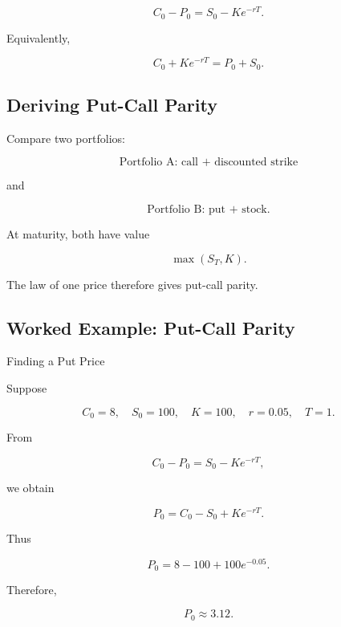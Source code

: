 \[
\boxed{
C_0-P_0
=
S_0-Ke^{-rT}.
}
\]

Equivalently,

\[
\boxed{
C_0+Ke^{-rT}
=
P_0+S_0.
}
\]

\subsection{Deriving Put-Call Parity}
\label{subsec:deriving-put-call-parity}

Compare two portfolios:

\[
\boxed{
\text{Portfolio A: call + discounted strike}
}
\]

and

\[
\boxed{
\text{Portfolio B: put + stock}.
}
\]

At maturity, both have value

\[
\boxed{
\max(S_T,K).
}
\]

The law of one price therefore gives put-call parity.

\subsection{Worked Example: Put-Call Parity}
\label{subsec:worked-put-call-parity}

\begin{workedexamplebox}{Finding a Put Price}

Suppose

\[
C_0=8,
\quad
S_0=100,
\quad
K=100,
\quad
r=0.05,
\quad
T=1.
\]

From

\[
C_0-P_0
=
S_0-Ke^{-rT},
\]

we obtain

\[
P_0
=
C_0-S_0+Ke^{-rT}.
\]

Thus

\[
P_0
=
8-100+100e^{-0.05}.
\]

Therefore,

\begin{answerbox}
\[
\boxed{
P_0\approx3.12.
}
\]
\end{answerbox}

\end{workedexamplebox}

